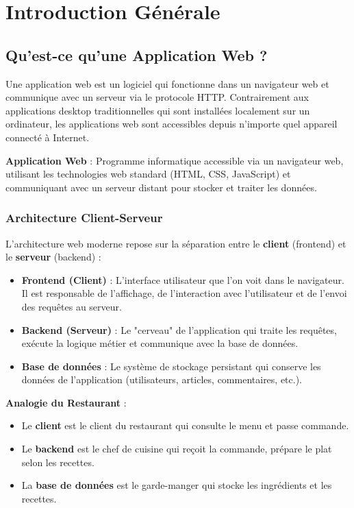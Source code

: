 \documentclass[a4paper,12pt]{book}
\begin{document}
\chapter{Introduction Générale}

\section{Qu'est-ce qu'une Application Web ?}

Une application web est un logiciel qui fonctionne dans un navigateur web et communique avec un serveur via le protocole HTTP. Contrairement aux applications desktop traditionnelles qui sont installées localement sur un ordinateur, les applications web sont accessibles depuis n'importe quel appareil connecté à Internet.

\begin{definitionbox}
    \textbf{Application Web} : Programme informatique accessible via un navigateur web, utilisant les technologies web standard (HTML, CSS, JavaScript) et communiquant avec un serveur distant pour stocker et traiter les données.
\end{definitionbox}

\subsection{Architecture Client-Serveur}

L'architecture web moderne repose sur la séparation entre le \textbf{client} (frontend) et le \textbf{serveur} (backend) :

\begin{itemize}
    \item \textbf{Frontend (Client)} : L'interface utilisateur que l'on voit dans le navigateur. Il est responsable de l'affichage, de l'interaction avec l'utilisateur et de l'envoi des requêtes au serveur.
    \item \textbf{Backend (Serveur)} : Le "cerveau" de l'application qui traite les requêtes, exécute la logique métier et communique avec la base de données.
    \item \textbf{Base de données} : Le système de stockage persistant qui conserve les données de l'application (utilisateurs, articles, commentaires, etc.).
\end{itemize}

\begin{analogybox}
    \textbf{Analogie du Restaurant} :
    \begin{itemize}
        \item Le \textbf{client} est le client du restaurant qui consulte le menu et passe commande.
        \item Le \textbf{backend} est le chef de cuisine qui reçoit la commande, prépare le plat selon les recettes.
        \item La \textbf{base de données} est le garde-manger qui stocke les ingrédients et les recettes.
    \end{itemize}
\end{analogybox}
\end{document}
